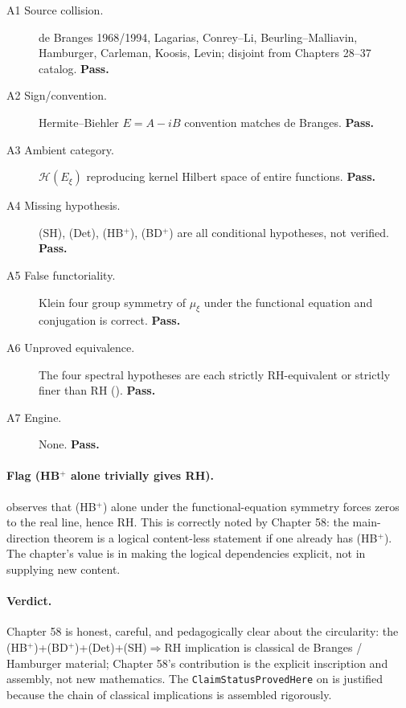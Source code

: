\begin{description}
\item[A1 Source collision.] de Branges 1968/1994, Lagarias,
Conrey--Li, Beurling--Malliavin, Hamburger, Carleman, Koosis,
Levin; disjoint from Chapters 28--37 catalog. \textbf{Pass.}
\item[A2 Sign/convention.] Hermite--Biehler \(E=A-iB\) convention
matches de Branges. \textbf{Pass.}
\item[A3 Ambient category.] \(\mathcal{H}(E_{\xi})\) reproducing
kernel Hilbert space of entire functions. \textbf{Pass.}
\item[A4 Missing hypothesis.] (SH), (Det), (HB\(^{+}\)), (BD\(^{+}\))
are all conditional hypotheses, not verified. \textbf{Pass.}
\item[A5 False functoriality.] Klein four group symmetry of
\(\mu_{\xi}\) under the functional equation and conjugation is
correct. \textbf{Pass.}
\item[A6 Unproved equivalence.] The four spectral hypotheses are
each strictly RH-equivalent or strictly finer than RH
(). \textbf{Pass.}
\item[A7 Engine.] None. \textbf{Pass.}
\end{description}

\paragraph{Flag (HB\(^{+}\) alone trivially gives RH).}
 observes that (HB\(^{+}\))
alone under the functional-equation symmetry forces zeros to the
real line, hence RH. This is correctly noted by Chapter 58: the
main-direction theorem is a logical content-less statement if one
already has (HB\(^{+}\)). The chapter's value is in making the
logical dependencies explicit, not in supplying new content.

\paragraph{Verdict.} Chapter 58 is honest, careful, and
pedagogically clear about the circularity: the
(HB\(^{+}\))+(BD\(^{+}\))+(Det)+(SH)\(\Rightarrow\)RH implication is
classical de Branges / Hamburger material; Chapter 58's contribution
is the explicit inscription and assembly, not new mathematics. The
\texttt{ClaimStatusProvedHere} on
 is justified because
the chain of classical implications is assembled rigorously.


